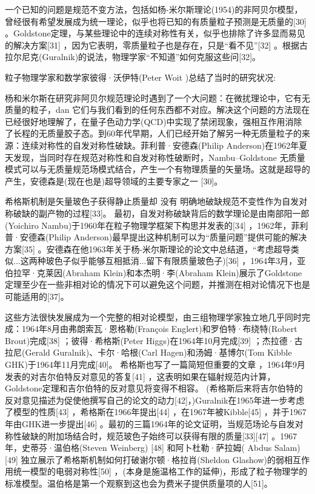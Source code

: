 一个已知的问题是规范不变方法，包括如杨-米尔斯理论(1954)的非阿贝尔模型，曾经很有希望发展成为统一理论，似乎也将已知的有质量粒子预测是无质量的[30] 。Goldstone定理，与某些理论中的连续对称性有关，似乎也排除了许多显而易见的解决方案[31] ，因为它表明，零质量粒子也是存在，只是“看不见”[32] 。根据古拉尔尼克(Guralnik)的说法，物理学家“不知道”如何克服这些问[32]。

粒子物理学家和数学家彼得·沃伊特(Peter Woit )总结了当时的研究状况:

杨和米尔斯在研究非阿贝尔规范理论时遇到了一个大问题：在微扰理论中，它有无质量的粒子，dan 它们与我们看到的任何东西都不对应。解决这个问题的方法现在已经很好地理解了，在量子色动力学(QCD)中实现了禁闭现象，强相互作用消除了长程的无质量胶子态。到60年代早期，人们已经开始了解另一种无质量粒子的来源：连续对称性的自发对称性破缺。菲利普·安德森(Philip Anderson)在1962年夏天发现，当同时存在规范对称性和自发对称性破断时，Nambu–Goldstone 无质量模式可以与无质量规范场模式结合，产生一个有物理质量的矢量场。这就是超导的产生，安德森是(现在也是)超导领域的主要专家之一 [30]。

希格斯机制是矢量玻色子获得静止质量却 没有 明确地破缺规范不变性作为自发对称破缺的副产物的过程[33]。 最初，自发对称破缺背后的数学理论是由南部阳一郎(Yoichiro Nambu)于1960年在粒子物理学框架下构思并发表的[34] ，1962年，菲利普·安德森(Philip Anderson)最早提出这种机制可以为“质量问题”提供可能的解决方案[35] 。安德森在他1963年关于杨-米尔斯理论的论文中总结道，“考虑超导类似...这两种玻色子似乎能够互相抵消...留下有限质量玻色子)[36] ，1964年3月，亚伯拉罕·克莱因(Abraham Klein)和本杰明·李(Abraham Klein)展示了Goldstone定理至少在一些非相对论的情况下可以避免这个问题，并推测在相对论情况下也是可能适用的[37]。

这些方法很快发展成为一个完整的相对论模型，由三组物理学家独立地几乎同时完成：1964年8月由弗朗索瓦·恩格勒(François Englert)和罗伯特·布绕特(Robert Brout)完成[38] ；彼得·希格斯(Peter Higgs)在1964年10月完成[39] ；杰拉德·古拉尼(Gerald Guralnik)、卡尔·哈根(Carl Hagen)和汤姆·基博尔(Tom Kibble GHK)于1964年11月完成[40]。 希格斯也写了一篇简短但重要的文章 ，1964年9月发表的对吉尔伯特反对意见的答复[41] ，这表明如果在辐射规范内计算，Goldstone定理和吉尔伯特的反对意见将变得不相容。 (希格斯后来将吉尔伯特的反对意见描述为促使他撰写自己的论文的动力[42]，)Guralnik在1965年进一步考虑了模型的性质[43] ，希格斯在1966年提出[44] ，在1967年被Kibble[45] ，并于1967年由GHK进一步提出[46] 。最初的三篇1964年的论文证明，当规范场论与自发对称性破缺的附加场结合时，规范玻色子始终可以获得有限的质量[33][47] 。1967年，史蒂芬·温伯格(Steven Weinberg) [48] 和阿卜杜勒·萨拉姆( Abdus Salam)[49] 独立展示了希格斯机制如何打破谢尔顿·格拉肖(Sheldon Glashow)的弱相互作用统一模型的电弱对称性[50] ，(本身是施温格工作的延伸)，形成了粒子物理学的标准模型。温伯格是第一个观察到这也会为费米子提供质量项的人[51]。

